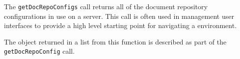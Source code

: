 The \verb+getDocRepoConfigs+ call returns all of the document repository configurations in use
on a \Rapture server. This call is often used in management user interfaces to provide a high level
starting point for navigating a \Rapture environment.

The object returned in a list from this function is described as part of the \verb+getDocRepoConfig+ call.
